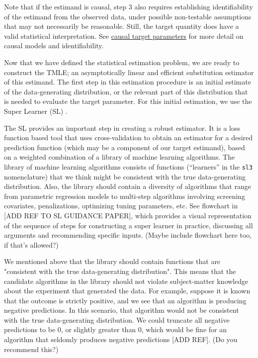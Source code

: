 \documentclass[12pt, krantz2,]{krantz}
\newcommand{\passthrough}[1]{#1}
\theoremstyle{definition}
\theoremstyle{definition}
\theoremstyle{definition}
\newcommand{\1}{\mathbbm{1}}
\begin{document}
Note that if the estimand is causal, step 3 also requires establishing
identifiability of the estimand from the observed data, under possible
non-testable assumptions that may not necessarily be reasonable. Still, the
target quantity does have a valid statistical interpretation. See \protect\hyperlink{causal}{causal target
parameters} for more detail on causal models and identifiability.

Now that we have defined the statistical estimation problem, we are ready to
construct the TMLE; an asymptotically linear and efficient substitution
estimator of this estimand. The first step in this estimation procedure is an
initial estimate of the data-generating distribution, or the relevant part of
this distribution that is needed to evaluate the target parameter. For this
initial estimation, we use the Super Learner (SL) \citep{vdl2007super}.

The SL provides an important step in creating a robust estimator. It is a
loss function based tool that uses cross-validation to obtain an estimator for
a desired prediction function (which may be a component of our target estimand),
based on a weighted combination of a library of machine learning algorithms.
The library of machine learning algorithms consists of functions (``learners'' in
the \passthrough{\lstinline!sl3!} nomenclature) that we think might be consistent with the true
data-generating distribution. Also, the library should contain a diversity of
algorithms that range from parametric regression models to multi-step algorithms
involving screening covariates, penalizations, optimizing tuning parameters,
etc. See flowchart in {[}ADD REF TO SL GUIDANCE PAPER{]}, which provides a visual
representation of the sequence of steps for constructing a super learner in
practice, discussing all arguments and recommending specific inputs. (Maybe
include flowchart here too, if that's allowed?)

\begin{shortbox}
We mentioned above that the library should contain functions that are  
"consistent with the true data-generating distribution". This means that 
the candidate algorithms in the library should not violate subject-matter 
knowledge about the experiment that generated the data. For example, suppose it 
is known that the outcome is strictly positive, and we see that an algorithm is 
producing negative predictions. In this scenario, that algorithm would not be 
consistent with the true data-generating distribution. We could truncate all
negative predictions to be 0, or slightly greater than 0, which would be fine 
for an algorithm that seldomly produces negative predictions [ADD REF]. (Do 
you recommend this?)
\end{shortbox}
\end{document}
